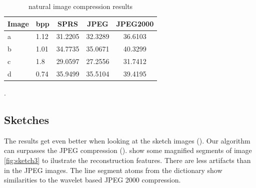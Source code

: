 \begin{table}[h]
\centering

\begin{tabular}{| l l | c | c | c|}
\hline\hline
Image & bpp & SPRS & JPEG & JPEG2000 \\
\hline
a & 1.12 & 31.2205 & 32.3289 & 36.6103 \\
b & 1.01 & 34.7735 & 35.0671 & 40.3299 \\
c & 1.8  & 29.0597 & 27.2556 & 31.7412 \\
d & 0.74  & 35.9499 & 35.5104 & 39.4195 \\
\hline
\end{tabular}
\caption{natural image compression results}
\label{tab:compression1}.
\end{table} 

\newpage
\subsection{Sketches}
The results get even better when looking at the sketch images
(). Our algorithm can surpasses the JPEG compression
().  show some magnified
segments of image \ref{fig:sketch3} to ilustrate the reconstruction features.
There are less artifacts than in the JPEG images. The line segment atoms from
the dictionary show similarities to the wavelet based JPEG 2000 compression.

